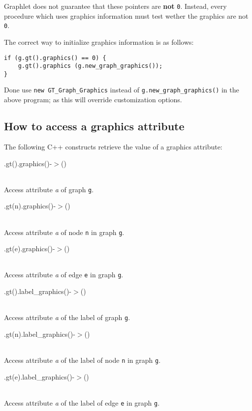\documentclass[twoside,fleqn]{report}
\begin{document}
\begin{notes}
  
  \item Graphlet does not guarantee that these pointers are
  \textbf{not} \texttt{0}. Instead, every procedure which uses
  graphics information must test wether the graphics are not
  \texttt{0}.

  \item The correct way to initialize graphics information is as follows:
\begin{verbatim}
if (g.gt().graphics() == 0) {
    g.gt().graphics (g.new_graph_graphics());
}
\end{verbatim}
  
  \item Done use \verb|new GT_Graph_Graphics| instead of
  \verb|g.new_graph_graphics()| in the above program; as this
  will override customization options.

\end{notes}


\subsection{How to access a graphics attribute}

The following C++ constructs retrieve the value of a graphics 
attribute:

\begin{ttdescription}
  
  \item[\Param{g}.gt().graphics()-$>$\Param{a}()] \strut\\
   Access attribute \emph{a} of graph \texttt{g}.
  
  \item[\Param{g}.gt(n).graphics()-$>$\Param{a}()] \strut\\
  Access attribute \emph{a} of node \texttt{n} in graph \texttt{g}.
  
  \item[\Param{g}.gt(e).graphics()-$>$\Param{a}()] \strut\\
  Access attribute \emph{a} of edge \texttt{e} in graph \texttt{g}.
  
  \item[\Param{g}.gt().label\_graphics()-$>$\Param{a}()] \strut\\
  Access attribute \emph{a} of the label of graph \texttt{g}.
  
  \item[\Param{g}.gt(n).label\_graphics()-$>$\Param{a}()] \strut\\
  Access attribute \emph{a} of the label of node \texttt{n} in graph 
  \texttt{g}.
  
  \item[\Param{g}.gt(e).label\_graphics()-$>$\Param{a}()] \strut\\
  Access attribute \emph{a} of the label of edge \texttt{e} in graph 
  \texttt{g}.

\end{ttdescription}
\end{document}
